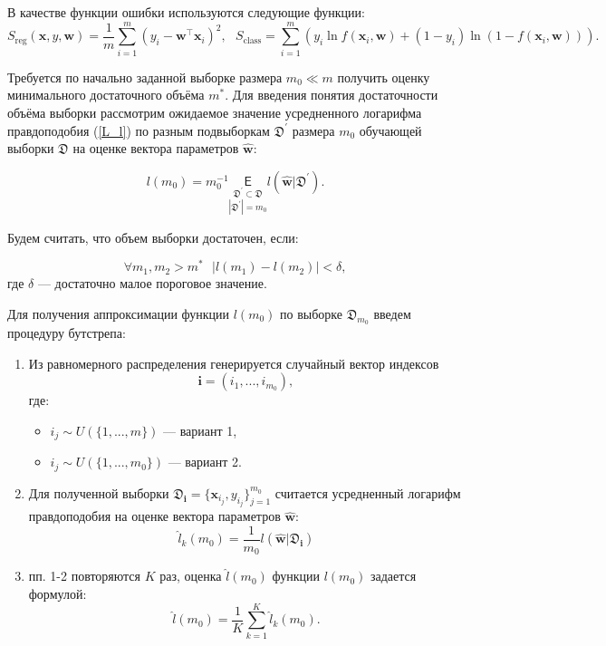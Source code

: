 \documentclass[12pt,twoside]{article}
\begin{document}
В качестве функции ошибки используются следующие функции:
\begin{equation}\label{MSE_CE}
S_{\text{reg}}(\mathbf{x}, y, \textbf{w}) = \frac{1}{m}\sum\limits_{i=1}^{m}(y_i - \textbf{w}^{\top}\mathbf{x}_i )^2, ~~~ S_{\text{class}} = \sum\limits_{i=1}^{m}(y_i\ln f(\mathbf{x}_i, \mathbf{w}) + (1 - y_i)\ln(1 - f(\mathbf{x}_i, \mathbf{w}))).
\end{equation}

Требуется по начально заданной выборке размера $m_0 \ll m$ получить оценку минимального достаточного объёма $m^{*}$. Для введения понятия достаточности объёма  выборки рассмотрим ожидаемое значение усредненного логарифма правдоподобия (\ref{L_l}) по разным подвыборкам $\mathfrak D^{\prime}$ размера $m_0$ обучающей выборки $\mathfrak{D}$ на оценке вектора параметров $\hat{\mathbf{w}}$:

$$
l(m_0) = m_0^{-1}\underset{|\mathfrak D^{\prime}| = m_0}{\underset{\mathfrak D^{\prime} \subset \mathfrak D}{\mathsf E}} l(\hat{\mathbf{w}} | \mathfrak D^{\prime}).
$$

Будем считать, что объем выборки достаточен, если:

$$
\forall m_1, m_2 > m^* ~~~ |l(m_1) - l(m_2)| < \delta,
$$
где $\delta$ --- достаточно малое пороговое значение.

Для получения аппроксимации функции $l(m_0)$ по выборке $\mathfrak D_{m_0}$ введем процедуру бутстрепа:

\begin{enumerate}
	\item Из равномерного распределения генерируется случайный вектор индексов 
$$
\mathbf{i} = (i_1, ..., i_{m_0}),
$$
где:
	\begin{itemize}
		\item $i_j \sim U(\{1, ..., m\})$ --- вариант 1,
		\item $i_j \sim U(\{1, ..., m_0\})$ --- вариант 2.
	\end{itemize}
	\item Для полученной выборки $\mathfrak D_{\mathbf{i}} = \{\mathbf{x}_{i_j}, y_{i_j}\}_{j=1}^{m_0}$ считается усредненный логарифм правдоподобия на оценке вектора параметров $\hat{\mathbf{w}}$:
$$
\hat{l}_{k}(m_0) = \frac{1}{m_0}l(\hat{\mathbf{w}} | \mathfrak D_{\mathbf{i}})
$$
	\item пп. 1-2 повторяются $K$ раз, оценка $\hat{l}(m_0)$ функции $l(m_0)$ задается формулой:
$$
\hat{l}(m_0) = \frac{1}{K}\sum\limits_{k=1}^K \hat{l}_{k}(m_0).
$$
\end{enumerate}
\end{document}
